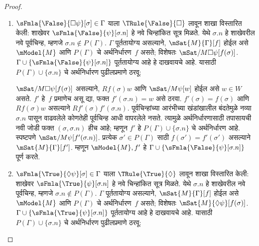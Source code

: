 \begin{proof}
\begin{enumerate}
\item $\sFmla{\False}{\Box \psi}[\sigma] \in \Gamma$
  याला
  $\TRule{\False}{\Box}$ लावून शाखा विस्तारित केली:
  शाखेवर
    $\sFmla{\False}{\psi}[\sigma.n]$ हे नवे
    चिन्हांकित सूत्र मिळते. येथे
    $\sigma.n$ हे शाखेवरील नवे पूर्वचिन्ह,
    म्हणजे $\sigma.n \notin P(\Gamma)$.
    $\Gamma$ पूर्ततायोग्य असल्याने,
    $\mSat{M}{\Gamma}[f]$ होईल असे
    $\mModel{M}$ आणि $P(\Gamma)$ चे
    अर्थनिर्धारण~$f$ असते; विशेषतः
    $\mSat/{M}{\Box \psi}[f(\sigma)]$.
    $\Gamma \cup
    \{\sFmla{\False}{\psi}[\sigma.n]\}$
    पूर्ततायोग्य आहे हे दाखवायचे आहे.
    यासाठी $P(\Gamma) \cup \{\sigma.n\}$
    चे अर्थनिर्धारण पुढीलप्रमाणे ठरवू:

  $\mSat/{M}{\Box \psi}[f(\sigma)]$ असल्याने,
  $Rf(\sigma)w$ आणि $\mSat/{M}{\psi}[w]$
  होईल असे $w \in W$ असते. $f'$ हे~$f$
  प्रमाणेच असू द्या, फक्त
  $f'(\sigma.n) = w$ असे ठरवा.
  $f'(\sigma) = f(\sigma)$ आणि
  $Rf(\sigma)w$ असल्याने
  $Rf'(\sigma)f'(\sigma.n)$.
  पूर्वचिन्हांच्या आरंभीच्या खंडांखालील बंदतेमुळे नव्या
  $\sigma.n$ पासून वाढवलेले कोणतेही पूर्वचिन्ह आधी वापरलेले
  नसते. त्यामुळे अर्थनिर्धारणासाठी तपासायची नवी जोडी फक्त
  $(\sigma,\sigma.n)$ हीच आहे; म्हणून $f'$
  हे $P(\Gamma) \cup \{\sigma.n\}$ चे
  अर्थनिर्धारण आहे. स्पष्टपणे
  $\mSat/{M}{\psi}[f'(\sigma.n)]$.
  प्रत्येक $\sigma' \in P(\Gamma)$ साठी
  $f(\sigma') = f'(\sigma')$ असल्याने
  $\mSat{M}{\Gamma}[f']$. म्हणून
  $\mModel{M}, f'$ हे $\Gamma \cup
  \{\sFmla{\False}{\psi}[\sigma.n]\}$ पूर्ण करते.



\item $\sFmla{\True}{\Diamond \psi}[\sigma] \in \Gamma$
  याला
  $\TRule{\True}{\Diamond}$ लावून शाखा विस्तारित
  केली: शाखेवर
    $\sFmla{\True}{\psi}[\sigma.n]$ हे नवे
    चिन्हांकित सूत्र मिळते. येथे
    $\sigma.n$ हे शाखेवरील नवे पूर्वचिन्ह,
    म्हणजे $\sigma.n \notin P(\Gamma)$.
    $\Gamma$ पूर्ततायोग्य असल्याने,
    $\mSat{M}{\Gamma}[f]$ होईल असे
    $\mModel{M}$ आणि $P(\Gamma)$ चे
    अर्थनिर्धारण~$f$ असते; विशेषतः
    $\mSat{M}{\Diamond \psi}[f(\sigma)]$.
    $\Gamma \cup
    \{\sFmla{\True}{\psi}[\sigma.n]\}$
    पूर्ततायोग्य आहे हे दाखवायचे आहे.
    यासाठी $P(\Gamma) \cup \{\sigma.n\}$
    चे अर्थनिर्धारण पुढीलप्रमाणे ठरवू:


\end{enumerate}
\end{proof}
